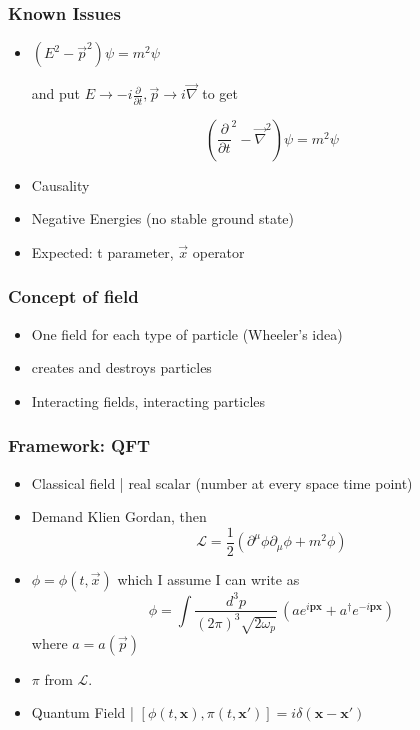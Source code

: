 \documentclass{beamer}
\begin{document}
\begin{frame}
	\frametitle{Known Issues}
		\begin{itemize}
			\item $\left(E^{2}-\vec{p}^{2}\right)\psi=m^{2}\psi$ \pause 

			and put $E\to-i\frac{\partial}{\partial t}, \vec{p}\rightarrow i\vec{\nabla}$ to get

			\pause
\[
( \frac{\partial}{\partial t}^{2}-\vec{\nabla}^{2} ) \psi=m^{2}\psi
\]
			\pause
			\item Causality
			\pause
			\item Negative Energies (no stable ground state)
			\pause
			\item Expected: t parameter, $\vec{x}$ operator
		\end{itemize}
\end{frame}

\begin{frame}
	\frametitle{Concept of field}
		\begin{itemize}
			\item One field for each type of particle \pause (Wheeler's idea)
			\pause
			\item creates and destroys particles
			\pause
			\item Interacting fields, interacting particles
			\pause
		\end{itemize}
\end{frame}

\begin{frame}
	\frametitle{Framework: QFT}
		\begin{itemize}
			\item Classical field | real scalar (number at every space time point)
			\pause
			\item Demand Klien Gordan, then 
			\[
				\mathcal{L}=\frac{1}{2}\left(\partial^{\mu}\phi\partial_{\mu}\phi+m^{2}\phi\right)
			\]
			\pause
			\item $\phi=\phi(t,\vec{x})$ which I assume I can write as
			\pause 
			\[
			\phi=\int\frac{d^{3}p}{\left(2\pi\right)^{3}\sqrt{2\omega_{p}}}\,\left(ae^{i\mathbf{px}}+a^{\dagger}e^{-i\mathbf{px}}\right)
			\]
			where $a=a(\vec{p})$
			\pause
			\item $\pi$ from $\mathcal{L}$.
			\pause
			\item Quantum Field | $[\phi(t,\mathbf{x}),\pi(t,\mathbf{x}')]=i\delta(\mathbf{x}-\mathbf{x}')$			
		\end{itemize}
\end{frame}
\end{document}
